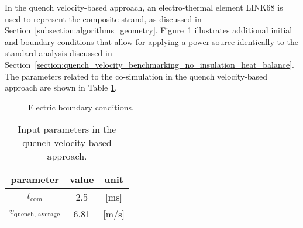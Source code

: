
In the quench velocity-based approach, an electro-thermal element LINK68 is used to represent the composite strand, as discussed in Section~\ref{subsection:algorithms_geometry}. Figure~\ref{fig: q_vel_benchmarking_electrical_settings} illustrates additional initial and boundary conditions that allow for applying a power source identically to the standard analysis discussed in Section~\ref{section:quench_velocity_benchmarking_no_insulation_heat_balance}. The parameters related to the co-simulation in the quench velocity-based approach are shown in Table \ref{table: 1d_qv_benchmarking_geometry_parameters_quench_velocity}. 

\begin{figure}[H]
\centering
{}
\caption{Electric boundary conditions.}
\label{fig: q_vel_benchmarking_electrical_settings}
\end{figure}

\begin{table}[H]
    \caption{Input parameters in the quench velocity-based approach.} 
    \vspace{-1.em} 
    \fontsize{10}{10}
    \selectfont 
    \renewcommand{\arraystretch}{1.5}
    \begin{center}
        \begin{tabular}{ ccc }  
        \hline
        parameter & value & unit \\
        \hline
        $t_\text{com}$ & 2.5 & [ms] \\
        $v_\text{quench, average}$ & 6.81 & [m/s] \\
        \hline 
        \end{tabular}
    \end{center}  
     \label{table: 1d_qv_benchmarking_geometry_parameters_quench_velocity} 
 \end{table}

